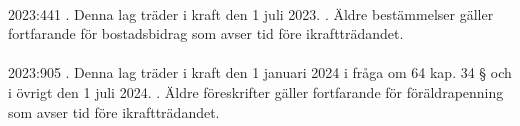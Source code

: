 \documentclass[a4paper,notitlepage,openany,10pt]{book}
\begin{document}
\paragraph*{}
2023:441
. Denna lag träder i kraft den 1 juli 2023.
. Äldre bestämmelser gäller fortfarande för bostadsbidrag som avser tid före ikraftträdandet.
\paragraph*{}
2023:905
. Denna lag träder i kraft den 1 januari 2024 i fråga om 64 kap. 34 § och i övrigt den 1 juli 2024.
. Äldre föreskrifter gäller fortfarande för föräldrapenning som avser tid före ikraftträdandet.
\printindex
\end{document}
